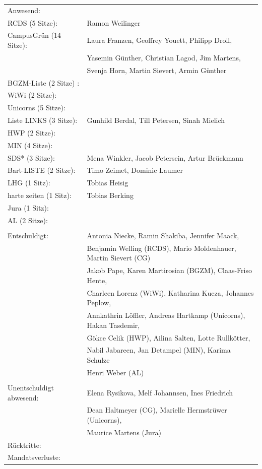 \documentclass[ngerman,headheight=70pt]{scrartcl}
\begin{document}
    \begin{tabular}{ll}
        Anwesend: & \\
            RCDS (5 Sitze): & Ramon Weilinger \\
             CampusGrün (14 Sitze): & Laura Franzen, Geoffrey Youett, Philipp Droll, \\
                                   & Yasemin Günther, Christian Lagod, Jim Martens, \\
                                   & Svenja Horn, Martin Sievert, Armin Günther \\
             BGZM-Liste (2 Sitze) : & \\
             WiWi (2 Sitze): & \\
             Unicorns (5 Sitze): &    \\
             Liste LINKS (3 Sitze): & Gunhild Berdal, Till Petersen, Sinah Mielich \\
             HWP (2 Sitze): &  \\
             MIN (4 Sitze): &  \\
             SDS* (3 Sitze): & Mena Winkler, Jacob Petersein, Artur Brückmann \\
             Bart-LISTE (2 Sitze): & Timo Zeimet, Dominic Laumer \\
             LHG (1 Sitz): & Tobias Heisig \\
             harte zeiten (1 Sitz): & Tobias Berking \\
             Jura (1 Sitz): & \\
             AL (2 Sitze): &  \\
            & \\
        Entschuldigt: & Antonia Niecke, Ramin Shakiba, Jennifer Maack, \\
                      & Benjamin Welling (RCDS), Mario Moldenhauer, Martin Sievert (CG) \\
                      & Jakob Pape, Karen Martirosian (BGZM), Claas-Friso Hente, \\
                      & Charleen Lorenz (WiWi), Katharina Kucza, Johannes Peplow, \\
                      & Annkathrin Löffler, Andreas Hartkamp (Unicorns), Hakan Tasdemir, \\
                      & Gökce Celik (HWP), Ailina Salten, Lotte Rullkötter, \\
                      & Nabil Jabareen, Jan Detampel (MIN), Karima Schulze\\
                      & Henri Weber (AL) \\
                      &\\
        Unentschuldigt abwesend: & Elena Rysikova, Melf Johannsen, Ines Friedrich \\
                                & Dean Haltmeyer (CG), Marielle Hermstrüwer (Unicorns), \\
                                & Maurice Martens (Jura)\\
        Rücktritte: & \\
        Mandatsverluste: & \\
    \end{tabular}
\end{document}
